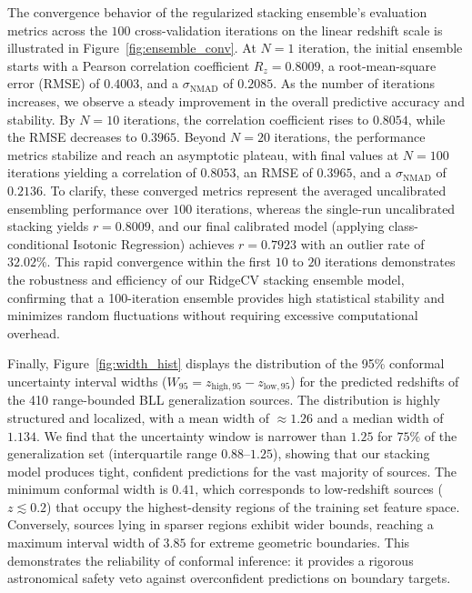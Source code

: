 \documentclass[twocolumn,linenumbers,floatfix]{aastex701}
\begin{document}
The convergence behavior of the regularized stacking ensemble's evaluation metrics across the $100$ cross-validation iterations on the linear redshift scale is illustrated in Figure~\ref{fig:ensemble_conv}. At $N = 1$ iteration, the initial ensemble starts with a Pearson correlation coefficient $R_z = 0.8009$, a root-mean-square error (RMSE) of $0.4003$, and a $\sigma_{\text{NMAD}}$ of $0.2085$. As the number of iterations increases, we observe a steady improvement in the overall predictive accuracy and stability. By $N = 10$ iterations, the correlation coefficient rises to $0.8054$, while the RMSE decreases to $0.3965$. Beyond $N = 20$ iterations, the performance metrics stabilize and reach an asymptotic plateau, with final values at $N = 100$ iterations yielding a correlation of $0.8053$, an RMSE of $0.3965$, and a $\sigma_{\text{NMAD}}$ of $0.2136$. To clarify, these converged metrics represent the averaged uncalibrated ensembling performance over $100$ iterations, whereas the single-run uncalibrated stacking yields $r = 0.8009$, and our final calibrated model (applying class-conditional Isotonic Regression) achieves $r = 0.7923$ with an outlier rate of $32.02\%$. This rapid convergence within the first $10$ to $20$ iterations demonstrates the robustness and efficiency of our RidgeCV stacking ensemble model, confirming that a 100-iteration ensemble provides high statistical stability and minimizes random fluctuations without requiring excessive computational overhead.

Finally, Figure~\ref{fig:width_hist} displays the distribution of the 95\% conformal uncertainty interval widths ($W_{95} = z_{\text{high}, 95} - z_{\text{low}, 95}$) for the predicted redshifts of the 410 range-bounded BLL generalization sources. The distribution is highly structured and localized, with a mean width of $\approx 1.26$ and a median width of $1.134$. We find that the uncertainty window is narrower than $1.25$ for $75\%$ of the generalization set (interquartile range $0.88$--$1.25$), showing that our stacking model produces tight, confident predictions for the vast majority of sources. The minimum conformal width is $0.41$, which corresponds to low-redshift sources ($z \lesssim 0.2$) that occupy the highest-density regions of the training set feature space. Conversely, sources lying in sparser regions exhibit wider bounds, reaching a maximum interval width of $3.85$ for extreme geometric boundaries. This demonstrates the reliability of conformal inference: it provides a rigorous astronomical safety veto against overconfident predictions on boundary targets.
\end{document}
